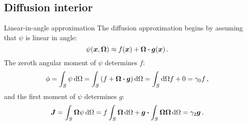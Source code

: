 \documentclass[draft]{beamer}
\begin{document}
\subsection{Diffusion interior}
\begin{frame}{Linear-in-angle approximation}
The diffusion approximation begins by assuming that $\psi$ is linear in angle:
\begin{equation*}
  \psi(\bm{x}, \bm{\Omega}) \approx f(\bm{x}) + \bm{\Omega} \bm{\cdot}
  \bm{g}(\bm{x})\,.
\end{equation*}
The zeroth angular moment of $\psi$ determines $f$:
\begin{equation*}
  \phi = \int_S \psi \mathop{}\!\mathrm{d}\Omega
= \int_S \left( f + \bm{\Omega}\bm{\cdot} \bm{g} \right) \mathop{}\!\mathrm{d}\Omega
= \int_S\mathop{}\!\mathrm{d}\Omega f + 0
= \gamma_0 f \,,
\end{equation*}
and the first moment of $\psi$ determines $g$:
\begin{equation*}
  \bm{J} = \int_S \bm{\Omega} \psi \mathop{}\!\mathrm{d}\Omega
= f \int_S \bm{\Omega} \mathop{}\!\mathrm{d}\Omega
  + \bm{g} \bm{\cdot} \int_S \bm{\Omega}\bm{\Omega} \mathop{}\!\mathrm{d}\Omega
= \gamma_2 \bm{g} \,.
\end{equation*}
%
%
%
\end{frame}
\end{document}
